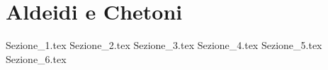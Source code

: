 \chapter{Aldeidi e Chetoni}

{Sezione_1.tex}
{Sezione_2.tex} %
{Sezione_3.tex} %
{Sezione_4.tex} %
{Sezione_5.tex} %
{Sezione_6.tex} %
